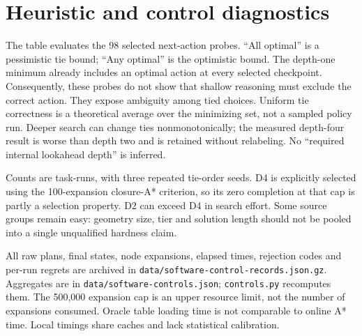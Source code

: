 \section{Heuristic and control diagnostics}
\begin{center}
\small
\end{center}
The table evaluates the 98 selected next-action probes. ``All optimal''
is a pessimistic tie bound; ``Any optimal'' is the optimistic bound.
The depth-one minimum already includes an optimal action at every selected
checkpoint. Consequently, these probes do not show that shallow reasoning
must exclude the correct action. They expose ambiguity among tied choices.
Uniform tie correctness is a theoretical average over the minimizing set,
not a sampled policy run. Deeper search can change ties nonmonotonically;
the measured depth-four result is worse than depth two and is retained
without relabeling. No ``required internal lookahead depth'' is inferred.

\begin{center}
\small
\end{center}
Counts are task-runs, with three repeated tie-order seeds. D4 is explicitly
selected using the 100-expansion closure-A* criterion, so its zero completion
at that cap is partly a selection property. D2 can exceed D4 in search
effort. Some source groups remain easy: geometry size, tier and solution
length should not be pooled into a single unqualified hardness claim.

All raw plans, final states, node expansions, elapsed times, rejection
codes and per-run regrets are archived in
\texttt{data/software-control-records.json.gz}. Aggregates are in
\texttt{data/software-controls.json}; \texttt{controls.py} recomputes them.
The 500,000 expansion cap is an upper resource limit, not the number
of expansions consumed. Oracle table loading time is not comparable to
online A* time. Local timings share caches and lack statistical calibration.

